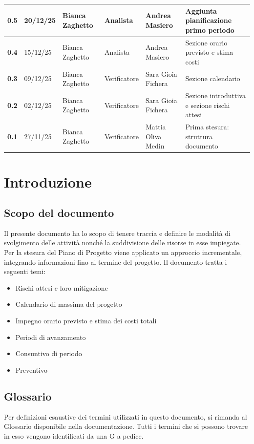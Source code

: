 \documentclass[a4paper,12pt]{article}
\begin{document}
\begin{xltabular}{\textwidth}{|l|l|X|l|X|X|}
\hline
\textbf{0.5} & 20/12/25 & Bianca Zaghetto & Analista & Andrea Masiero & Aggiunta pianificazione primo periodo \\
\hline
\textbf{0.4} & 15/12/25 & Bianca Zaghetto & Analista & Andrea Masiero & Sezione orario previsto e stima costi \\
\hline
\textbf{0.3} & 09/12/25 & Bianca Zaghetto & Verificatore & Sara Gioia Fichera & Sezione calendario \\
\hline
\textbf{0.2} & 02/12/25 & Bianca Zaghetto & Verificatore & Sara Gioia Fichera & Sezione introduttiva e sezione rischi attesi \\
\hline
\textbf{0.1} & 27/11/25 & Bianca Zaghetto & Verificatore & Mattia Oliva Medin & Prima stesura: struttura documento \\
\hline
\end{xltabular}

\newpage
\tableofcontents

\newpage
\listoffigures

\newpage
\listoftables

\newpage

\section{Introduzione}
    \subsection{Scopo del documento}
        Il presente documento ha lo scopo di tenere traccia e definire le modalità di svolgimento delle attività nonché la suddivisione delle risorse in esse impiegate.
        Per la stesura del Piano di Progetto viene applicato un approccio incrementale, integrando informazioni fino al termine del progetto. Il documento tratta i seguenti temi:
        \begin{itemize}
            \item Rischi attesi e loro mitigazione
            \item Calendario di massima del progetto
            \item Impegno orario previsto e stima dei costi totali
            \item Periodi di avanzamento
            \item Consuntivo di periodo
            \item Preventivo
        \end{itemize}
    \subsection{Glossario}
        Per definizioni esaustive dei termini utilizzati in questo documento, si rimanda al Glossario disponibile nella documentazione. Tutti i termini che si possono trovare in esso vengono identificati da una G a pedice.
\end{document}
